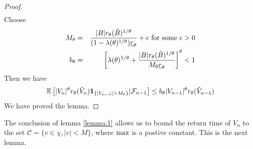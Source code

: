 \begin{proof}
\begin{eqnarray*}
  \end{eqnarray*}
  Choose
  \begin{eqnarray}
    M_\theta &=& {
      |B| r_\theta(\tilde B)^{1/\theta}
      \over
      (1 - \lambda(\theta)^{1/\theta}) \underline r_\theta
    } + \epsilon \text{ for some } \epsilon > 0 \label{eq:fdtyt} \\
    b_\theta &=&
    \left[
      \lambda(\theta)^{1/\theta} +
             {
               |B| r_\theta(\tilde B)^{1/\theta}
               \over
               M_\theta \underline r_\theta
             }
    \right]^\theta < 1 \nonumber 
  \end{eqnarray}
  Then we have
  \[
  \mathbb{E}
  \left[
    |V_n|^\theta r_{\theta}(\tilde V_n)
    \mathbf{1}_{\{|V_{n-1}| > M_{\theta}\}} | \mathcal F_{n-1}
    \right]
  \leq
  b_{\theta}
  |V_{n-1}|^\theta
  r_\theta(\tilde V_{n-1})
  \]
  We have proved the lemma.
\end{proof}
The conclusion of lemma \ref{lemma:1} allows us to bound the return
time of $V_n$ to the set $\mathcal C = \{v \in \chi, |v| < M\}$, where
${\text{max}}$ is a postive constant. This is the next lemma.

